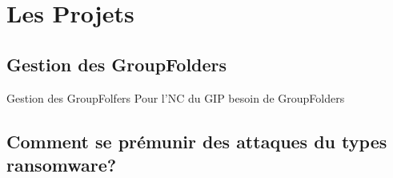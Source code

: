 \section{Les Projets}
\subsection{Gestion des GroupFolders}
\begin{frame}{Gestion des GroupFolfers}
Pour l'NC du GIP besoin de GroupFolders 
\end{frame}
\subsection{Comment se prémunir des attaques du types ransomware?}
\begin{frame}

\end{frame}